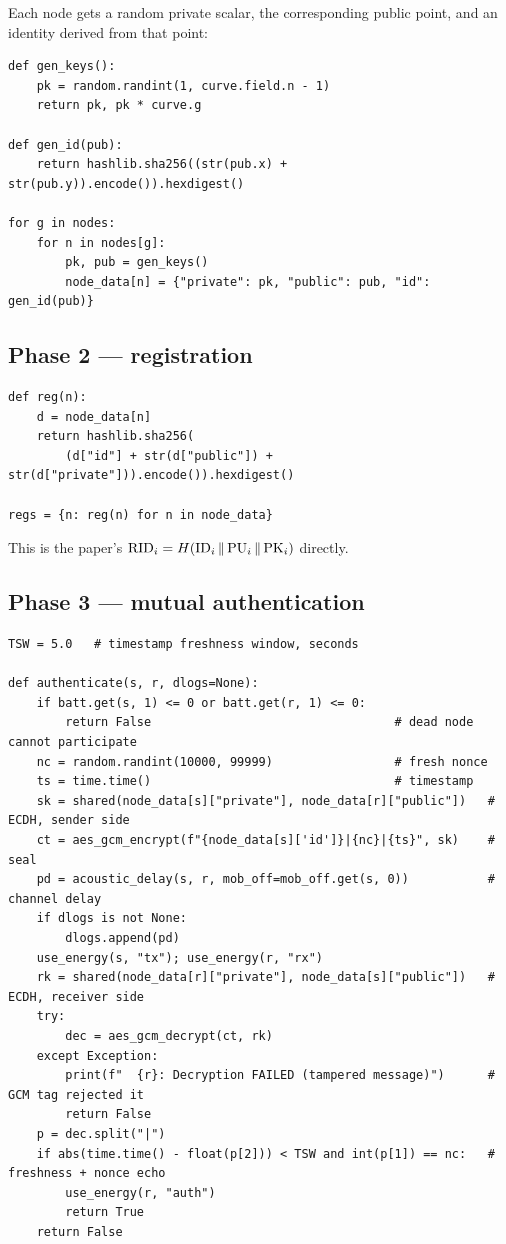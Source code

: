 Each node gets a random private scalar, the corresponding public point, and an identity
derived from that point:

\begin{lstlisting}[style=py,caption={Initialisation (lines 109--128).}]
def gen_keys():
    pk = random.randint(1, curve.field.n - 1)
    return pk, pk * curve.g

def gen_id(pub):
    return hashlib.sha256((str(pub.x) + str(pub.y)).encode()).hexdigest()

for g in nodes:
    for n in nodes[g]:
        pk, pub = gen_keys()
        node_data[n] = {"private": pk, "public": pub, "id": gen_id(pub)}
\end{lstlisting}

\subsection{Phase 2 --- registration}

\begin{lstlisting}[style=py,caption={Registration identifier (lines 148--152).}]
def reg(n):
    d = node_data[n]
    return hashlib.sha256(
        (d["id"] + str(d["public"]) + str(d["private"])).encode()).hexdigest()

regs = {n: reg(n) for n in node_data}
\end{lstlisting}

This is the paper's $\mathrm{RID}_i = H(\mathrm{ID}_i \,\|\, \mathrm{PU}_i \,\|\, \mathrm{PK}_i)$ directly.

\subsection{Phase 3 --- mutual authentication}

\begin{lstlisting}[style=py,caption={The authentication routine (lines 175--197). This is
the heart of the simulator.}]
TSW = 5.0   # timestamp freshness window, seconds

def authenticate(s, r, dlogs=None):
    if batt.get(s, 1) <= 0 or batt.get(r, 1) <= 0:
        return False                                  # dead node cannot participate
    nc = random.randint(10000, 99999)                 # fresh nonce
    ts = time.time()                                  # timestamp
    sk = shared(node_data[s]["private"], node_data[r]["public"])   # ECDH, sender side
    ct = aes_gcm_encrypt(f"{node_data[s]['id']}|{nc}|{ts}", sk)    # seal
    pd = acoustic_delay(s, r, mob_off=mob_off.get(s, 0))           # channel delay
    if dlogs is not None:
        dlogs.append(pd)
    use_energy(s, "tx"); use_energy(r, "rx")
    rk = shared(node_data[r]["private"], node_data[s]["public"])   # ECDH, receiver side
    try:
        dec = aes_gcm_decrypt(ct, rk)
    except Exception:
        print(f"  {r}: Decryption FAILED (tampered message)")      # GCM tag rejected it
        return False
    p = dec.split("|")
    if abs(time.time() - float(p[2])) < TSW and int(p[1]) == nc:   # freshness + nonce echo
        use_energy(r, "auth")
        return True
    return False
\end{lstlisting}

